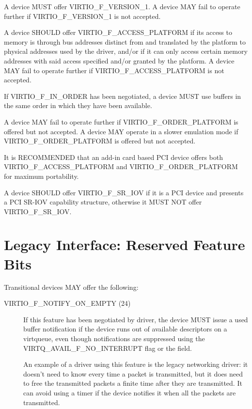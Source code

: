 
A device MUST offer VIRTIO_F_VERSION_1.  A device MAY fail to operate further
if VIRTIO_F_VERSION_1 is not accepted.

A device SHOULD offer VIRTIO_F_ACCESS_PLATFORM if its access to
memory is through bus addresses distinct from and translated
by the platform to physical addresses used by the driver, and/or
if it can only access certain memory addresses with said access
specified and/or granted by the platform.
A device MAY fail to operate further if VIRTIO_F_ACCESS_PLATFORM is not
accepted.

If VIRTIO_F_IN_ORDER has been negotiated, a device MUST use
buffers in the same order in which they have been available.

A device MAY fail to operate further if
VIRTIO_F_ORDER_PLATFORM is offered but not accepted.
A device MAY operate in a slower emulation mode if
VIRTIO_F_ORDER_PLATFORM is offered but not accepted.

It is RECOMMENDED that an add-in card based PCI device
offers both VIRTIO_F_ACCESS_PLATFORM and
VIRTIO_F_ORDER_PLATFORM for maximum portability.

A device SHOULD offer VIRTIO_F_SR_IOV if it is a PCI device
and presents a PCI SR-IOV capability structure, otherwise
it MUST NOT offer VIRTIO_F_SR_IOV.

\section{Legacy Interface: Reserved Feature Bits}\label{sec:Reserved Feature Bits / Legacy Interface: Reserved Feature Bits}

Transitional devices MAY offer the following:
\begin{description}
\item[VIRTIO_F_NOTIFY_ON_EMPTY (24)] If this feature
  has been negotiated by driver, the device MUST issue
  a used buffer notification if the device runs
  out of available descriptors on a virtqueue, even though
  notifications are suppressed using the VIRTQ_AVAIL_F_NO_INTERRUPT
  flag or the  field.
\begin{note}
  An example of a driver using this feature is the legacy
  networking driver: it doesn't need to know every time a packet
  is transmitted, but it does need to free the transmitted
  packets a finite time after they are transmitted. It can avoid
  using a timer if the device notifies it when all the packets
  are transmitted.
\end{note}
\end{description}

